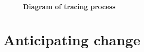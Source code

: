 








\begin{figure}
\centering
\resizebox{1.0\textwidth}{!}{}
\caption[Diagram of tracing process]{\textbf{Diagram of tracing process}}\label{fig:proc-tracing}
\end{figure}

\section{Anticipating change}


